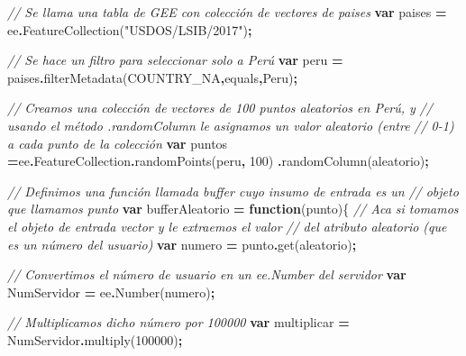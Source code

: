 \documentclass[
  12pt,
  letterpaper,
  twoside]{book}
\newenvironment{Shaded}{\begin{snugshade}}{\end{snugshade}}
\newcommand{\AttributeTok}[1]{\textcolor[rgb]{0.77,0.63,0.00}{#1}}
\newcommand{\CommentTok}[1]{\textcolor[rgb]{0.56,0.35,0.01}{\textit{#1}}}
\newcommand{\DecValTok}[1]{\textcolor[rgb]{0.00,0.00,0.81}{#1}}
\newcommand{\FunctionTok}[1]{\textcolor[rgb]{0.00,0.00,0.00}{#1}}
\newcommand{\KeywordTok}[1]{\textcolor[rgb]{0.13,0.29,0.53}{\textbf{#1}}}
\newcommand{\NormalTok}[1]{#1}
\newcommand{\OperatorTok}[1]{\textcolor[rgb]{0.81,0.36,0.00}{\textbf{#1}}}
\newcommand{\StringTok}[1]{\textcolor[rgb]{0.31,0.60,0.02}{#1}}
\begin{document}
\begin{Shaded}
\begin{Highlighting}[]
\CommentTok{// Se llama una tabla de GEE con colección de vectores de paises }
\KeywordTok{var}\NormalTok{ paises }\OperatorTok{=}\NormalTok{ ee}\OperatorTok{.}\FunctionTok{FeatureCollection}\NormalTok{(}\StringTok{"USDOS/LSIB/2017"}\NormalTok{)}\OperatorTok{;} 

\CommentTok{// Se hace un filtro para seleccionar solo a Perú }
\KeywordTok{var}\NormalTok{ peru }\OperatorTok{=}\NormalTok{ paises}\OperatorTok{.}\FunctionTok{filterMetadata}\NormalTok{(}\StringTok{\textquotesingle{}COUNTRY\_NA\textquotesingle{}}\OperatorTok{,}\StringTok{\textquotesingle{}equals\textquotesingle{}}\OperatorTok{,}\StringTok{\textquotesingle{}Peru\textquotesingle{}}\NormalTok{)}\OperatorTok{;} 

\CommentTok{// Creamos una colección de vectores de 100 puntos aleatorios en Perú, y }
\CommentTok{// usando el método .randomColumn le asignamos un valor aleatorio (entre }
\CommentTok{// 0{-}1) a cada punto de la colección}
\KeywordTok{var}\NormalTok{ puntos }\OperatorTok{=}\NormalTok{ee}\OperatorTok{.}\AttributeTok{FeatureCollection}\OperatorTok{.}\FunctionTok{randomPoints}\NormalTok{(peru}\OperatorTok{,} \DecValTok{100}\NormalTok{)}
  \OperatorTok{.}\FunctionTok{randomColumn}\NormalTok{(}\StringTok{\textquotesingle{}aleatorio\textquotesingle{}}\NormalTok{)}\OperatorTok{;}  

\CommentTok{// Definimos una función llamada buffer cuyo insumo de entrada es un }
\CommentTok{// objeto que llamamos \textquotesingle{}punto\textquotesingle{}}
\KeywordTok{var}\NormalTok{ bufferAleatorio }\OperatorTok{=} \KeywordTok{function}\NormalTok{(punto)\{   }
  \CommentTok{// Aca si tomamos el objeto de entrada \textquotesingle{}vector\textquotesingle{} y le extraemos el valor }
  \CommentTok{// del atributo \textquotesingle{}aleatorio\textquotesingle{} (que es un número del usuario)  }
  \KeywordTok{var}\NormalTok{ numero }\OperatorTok{=}\NormalTok{ punto}\OperatorTok{.}\FunctionTok{get}\NormalTok{(}\StringTok{\textquotesingle{}aleatorio\textquotesingle{}}\NormalTok{)}\OperatorTok{;}  
 
  \CommentTok{// Convertimos el número de usuario en un \textasciigrave{}ee.Number\textasciigrave{} del servidor}
  \KeywordTok{var}\NormalTok{ NumServidor }\OperatorTok{=}\NormalTok{ ee}\OperatorTok{.}\FunctionTok{Number}\NormalTok{(numero)}\OperatorTok{;}   

  \CommentTok{// Multiplicamos dicho número por 100000}
  \KeywordTok{var}\NormalTok{ multiplicar }\OperatorTok{=}\NormalTok{ NumServidor}\OperatorTok{.}\FunctionTok{multiply}\NormalTok{(}\DecValTok{100000}\NormalTok{)}\OperatorTok{;} 
 

\end{Highlighting}
\end{Shaded}
\end{document}
